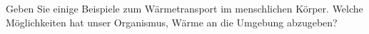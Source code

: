 Geben Sie einige Beispiele zum Wärmetransport im menschlichen Körper. Welche Möglichkeiten hat unser Organismus, Wärme an die Umgebung abzugeben?
